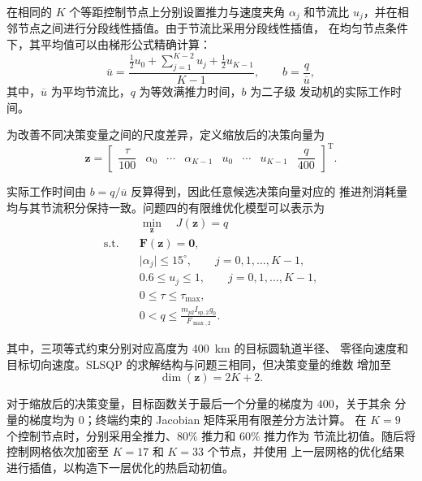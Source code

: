 \documentclass{JXUSTmodeling}
\begin{document}
在相同的 $K$ 个等距控制节点上分别设置推力与速度夹角 $\alpha_j$ 和节流比
$u_j$，并在相邻节点之间进行分段线性插值。由于节流比采用分段线性插值，
在均匀节点条件下，其平均值可以由梯形公式精确计算：
\begin{equation}
	\overline{u}
	=
	\frac{
		\displaystyle
		\frac{1}{2}u_0
		+
		\sum_{j=1}^{K-2}u_j
		+
		\frac{1}{2}u_{K-1}
	}{
		K-1
	},
	\qquad
	b=\frac{q}{\overline{u}},
	\label{eq:average_throttle}
\end{equation}
其中，$\overline{u}$ 为平均节流比，$q$ 为等效满推力时间，$b$ 为二子级
发动机的实际工作时间。

为改善不同决策变量之间的尺度差异，定义缩放后的决策向量为
\begin{equation}
	\mathbf{z}
	=
	\begin{bmatrix}
		\dfrac{\tau}{100} &
		\alpha_0 &
		\cdots &
		\alpha_{K-1} &
		u_0 &
		\cdots &
		u_{K-1} &
		\dfrac{q}{400}
	\end{bmatrix}^{\mathrm{T}}.
	\label{eq:scaled_dual_control_vector}
\end{equation}

实际工作时间由 $b=q/\overline{u}$ 反算得到，因此任意候选决策向量对应的
推进剂消耗量均与其节流积分保持一致。问题四的有限维优化模型可以表示为
\begin{equation}
	\begin{aligned}
		& \underset{\mathbf{z}}{\min}
		\quad
		 J(\mathbf{z})=q \\
		\text{s.t.}
		\quad
		& \mathbf{F}(\mathbf{z})=\mathbf{0}, \\
		& \lvert\alpha_j\rvert\leq 15^\circ,
		\qquad j=0,1,\ldots,K-1, \\
		& 0.6\leq u_j\leq 1,
		\qquad j=0,1,\ldots,K-1, \\
		& 0\leq\tau\leq\tau_{\max}, \\
		& 0<q\leq
		\frac{
			m_{p2}I_{\mathrm{sp},2}g_0
		}{
			F_{\max,2}
		}.
	\end{aligned}
	\label{eq:dual_control_optimization}
\end{equation}

其中，三项等式约束分别对应高度为 \SI{400}{\kilo\metre} 的目标圆轨道半径、
零径向速度和目标切向速度。SLSQP 的求解结构与问题三相同，但决策变量的维数
增加至
\begin{equation}
	\dim(\mathbf{z})=2K+2.
\end{equation}

对于缩放后的决策变量，目标函数关于最后一个分量的梯度为 $400$，关于其余
分量的梯度均为 $0$；终端约束的 Jacobian 矩阵采用有限差分方法计算。
在 $K=9$ 个控制节点时，分别采用全推力、$80\%$ 推力和 $60\%$ 推力作为
节流比初值。随后将控制网格依次加密至 $K=17$ 和 $K=33$ 个节点，并使用
上一层网格的优化结果进行插值，以构造下一层优化的热启动初值。
\end{document}
